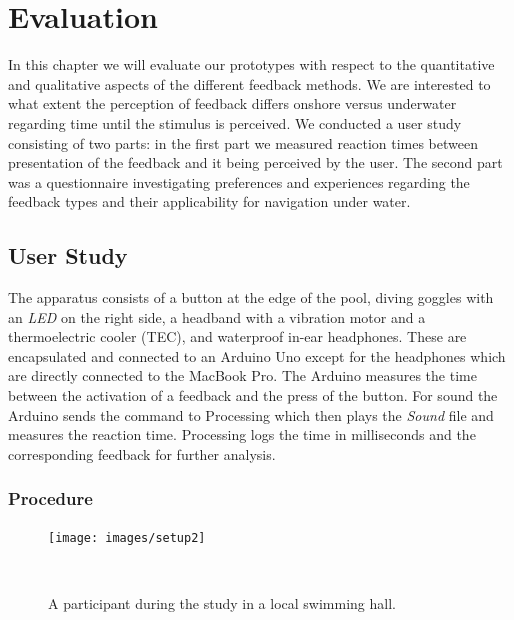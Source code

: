%

\chapter{Evaluation}
\label{evaluation}

In this chapter we will evaluate our prototypes with respect to the quantitative and qualitative aspects of the different feedback methods. We are interested to what extent the perception of feedback differs onshore versus underwater regarding time until the stimulus is perceived. 
We conducted a user study consisting of two parts: in the first part we measured reaction times between presentation of the feedback and it being perceived by the user.
The second part was a questionnaire investigating preferences and experiences regarding the feedback types and their applicability for navigation under water. 
  

\section{User Study}

The apparatus consists of a button at the edge of the pool, diving goggles with an \emph{LED} on the right side, a headband with a vibration motor and a thermoelectric cooler (TEC), and waterproof in-ear headphones. 
These are encapsulated and connected to an Arduino Uno except for the headphones which are directly connected to the MacBook Pro. 
The Arduino measures the time between the activation of a feedback and the press of the button. 
For sound the Arduino sends the command to Processing which then plays the \emph{Sound} file and measures the reaction time. 
Processing logs the time in milliseconds and the corresponding feedback for further analysis.

\subsection{Procedure}

\begin{figure}
	\centering
	\texttt{[image: images/setup2]}
	\caption{A participant during the study in a local swimming hall.}~\label{fig:setup2}
	\vspace{-2em}
\end{figure}

